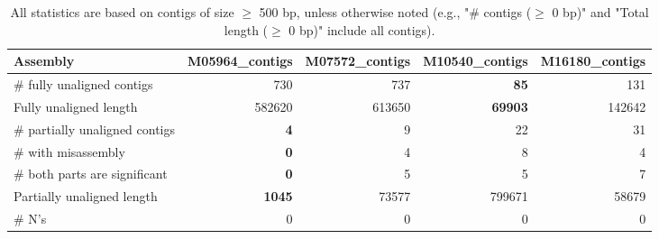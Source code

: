 \documentclass[12pt,a4paper]{article}
\begin{document}
\begin{table}[ht]
\begin{center}
\caption{All statistics are based on contigs of size $\geq$ 500 bp, unless otherwise noted (e.g., "\# contigs ($\geq$ 0 bp)" and "Total length ($\geq$ 0 bp)" include all contigs).}
\begin{tabular}{|l*{4}{|r}|}
\hline
Assembly & M05964\_contigs & M07572\_contigs & M10540\_contigs & M16180\_contigs \\ \hline
\# fully unaligned contigs & 730 & 737 & {\bf 85} & 131 \\ \hline
Fully unaligned length & 582620 & 613650 & {\bf 69903} & 142642 \\ \hline
\# partially unaligned contigs & {\bf 4} & 9 & 22 & 31 \\ \hline
\hspace{5mm}\# with misassembly & {\bf 0} & 4 & 8 & 4 \\ \hline
\hspace{5mm}\# both parts are significant & {\bf 0} & 5 & 5 & 7 \\ \hline
Partially unaligned length & {\bf 1045} & 73577 & 799671 & 58679 \\ \hline
\# N's & 0 & 0 & 0 & 0 \\ \hline
\end{tabular}
\end{center}
\end{table}
\end{document}
